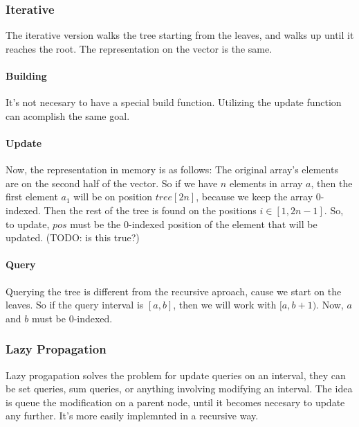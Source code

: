 \documentclass[a4paper,10pt,twocolumn, titlepage]{article}
\begin{document}
\subsubsection{Iterative}
The iterative version walks the tree starting from the leaves, and walks up until it reaches the root. The representation on the vector is the same.

\paragraph{Building} It's not necesary to have a special build function. Utilizing the update function can acomplish the same goal.

\paragraph{Update} Now, the representation in memory is as follows: The original array's elements are on the second half of the vector. So if we have $n$ elements in array $a$, then the first element $a_1$ will be on position $tree[2n]$, because we keep the array 0-indexed. Then the rest of the tree is found on the positions $i \in [1, 2n-1]$. So, to update, $pos$ must be the 0-indexed position of the element that will be updated. (TODO: is this true?)





\paragraph{Query} Querying the tree is different from the recursive aproach, cause we start on the leaves. So if the query interval is $[a, b]$, then we will work with $[a, b+1)$. Now, $a$ and $b$ must be 0-indexed.





\subsubsection{Lazy Propagation}

Lazy progapation solves the problem for update queries on an interval, they can be set queries, sum queries, or anything involving modifying an interval. The idea is queue the modification on a parent node, until it becomes necesary to update any further. It's more easily implemnted in a recursive way.
\end{document}
